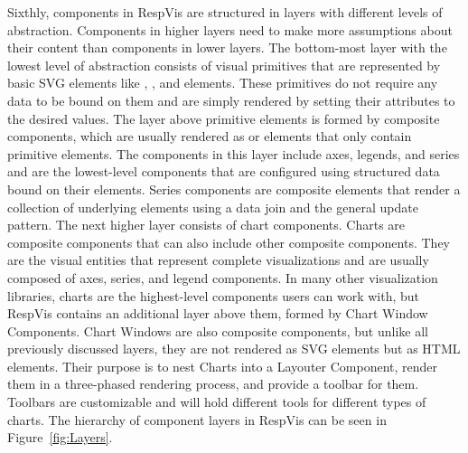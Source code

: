 Sixthly, components in RespVis are structured in layers with different levels of abstraction.
Components in higher layers need to make more assumptions about their content than components in lower layers.
The bottom-most layer with the lowest level of abstraction consists of visual primitives that are represented by basic SVG elements like , , and  elements.
These primitives do not require any data to be bound on them and are simply rendered by setting their attributes to the desired values.
The layer above primitive elements is formed by composite components, which are usually rendered as  or  elements that only contain primitive elements.
The components in this layer include axes, legends, and series and are the lowest-level components that are configured using structured data bound on their elements.
Series components are composite elements that render a collection of underlying elements using a data join and the general update pattern.
The next higher layer consists of chart components.
Charts are composite components that can also include other composite components.
They are the visual entities that represent complete visualizations and are usually composed of axes, series, and legend components. 
In many other visualization libraries, charts are the highest-level components users can work with, but RespVis contains an additional layer above them, formed by Chart Window Components.
Chart Windows are also composite components, but unlike all previously discussed layers, they are not rendered as SVG elements but as HTML  elements.
Their purpose is to nest Charts into a Layouter Component, render them in a three-phased rendering process, and provide a toolbar for them.
Toolbars are customizable and will hold different tools for different types of charts.
The hierarchy of component layers in RespVis can be seen in Figure~\ref{fig:Layers}. 


